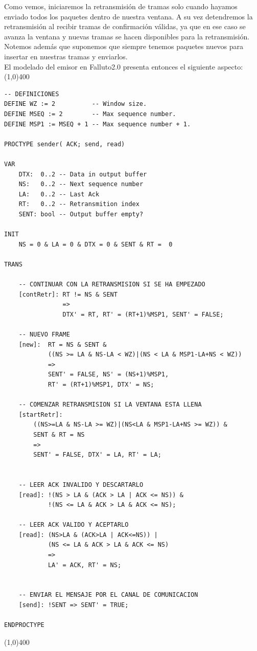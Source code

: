 \documentclass[titlepage, 12pt]{book}
\begin{document}
Como vemos, iniciaremos la retransmisi\'on de tramas solo cuando hayamos enviado todos los paquetes dentro de nuestra ventana. A su vez detendremos la retransmisi\'on al recibir tramas de confirmaci\'on v\'alidas, ya que en ese caso se avanza la ventana y nuevas tramas se hacen disponibles para la retransmisi\'on. Notemos adem\'as que suponemos que siempre tenemos paquetes nuevos para insertar en nuestras tramas y enviarlos.\\

El modelado del emisor en Falluto2.0 presenta entonces el siguiente aspecto:\\

\noindent \line(1,0){400}
\begin{verbatim}
-- DEFINICIONES
DEFINE WZ := 2          -- Window size.
DEFINE MSEQ := 2        -- Max sequence number.
DEFINE MSP1 := MSEQ + 1 -- Max sequence number + 1.

PROCTYPE sender( ACK; send, read)

VAR
    DTX:  0..2 -- Data in output buffer
    NS:   0..2 -- Next sequence number
    LA:   0..2 -- Last Ack
    RT:   0..2 -- Retransmition index
    SENT: bool -- Output buffer empty?

INIT
    NS = 0 & LA = 0 & DTX = 0 & SENT & RT =  0

TRANS

    -- CONTINUAR CON LA RETRANSMISION SI SE HA EMPEZADO
    [contRetr]: RT != NS & SENT 
                => 
                DTX' = RT, RT' = (RT+1)%MSP1, SENT' = FALSE;

    -- NUEVO FRAME 
    [new]:  RT = NS & SENT & 
            ((NS >= LA & NS-LA < WZ)|(NS < LA & MSP1-LA+NS < WZ))
            => 
            SENT' = FALSE, NS' = (NS+1)%MSP1, 
            RT' = (RT+1)%MSP1, DTX' = NS;

    -- COMENZAR RETRANSMISION SI LA VENTANA ESTA LLENA
    [startRetr]: 
        ((NS>=LA & NS-LA >= WZ)|(NS<LA & MSP1-LA+NS >= WZ)) & 
        SENT & RT = NS 
        => 
        SENT' = FALSE, DTX' = LA, RT' = LA;


    -- LEER ACK INVALIDO Y DESCARTARLO
    [read]: !(NS > LA & (ACK > LA | ACK <= NS)) & 
            !(NS <= LA & ACK > LA & ACK <= NS);

    -- LEER ACK VALIDO Y ACEPTARLO
    [read]: (NS>LA & (ACK>LA | ACK<=NS)) |
            (NS <= LA & ACK > LA & ACK <= NS) 
            => 
            LA' = ACK, RT' = NS;


    -- ENVIAR EL MENSAJE POR EL CANAL DE COMUNICACION
    [send]: !SENT => SENT' = TRUE;

ENDPROCTYPE
\end{verbatim}
\noindent \line(1,0){400}\\
\end{document}

